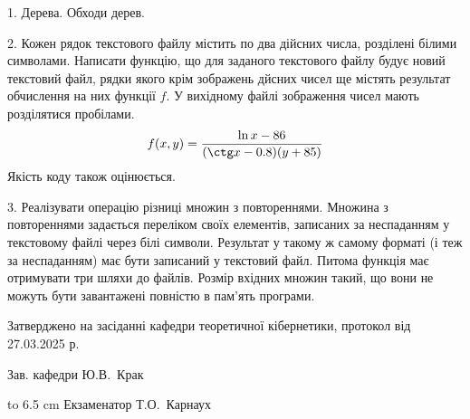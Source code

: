 \documentclass[12pt, ukrainian]{article}
\begin{document}
{%
1. Дерева. Обходи дерев.%
\par
\vspace{2mm}

2. Кожен рядок текстового файлу містить по два дійсних числа, розділені білими символами.
Написати функцію, що для заданого текстового файлу будує новий текстовий файл, рядки якого крім зображень дйсних чисел ще містять результат обчислення на них функції $f$. У вихідному файлі зображення чисел мають розділятися пробілами. 
$$f(x, y) =\frac{\ln x - 86}{(\ctg x - 0.8) (y + 85)}$$ 
Якість коду також оцінюється.

\par
\vspace{2mm}

3. Реалізувати операцію різниці множин з повтореннями. Множина з повтореннями задається переліком своїх елементів, записаних за неспаданням у текстовому файлі через білі символи. Результат у такому ж самому форматі (і теж за неспаданням) має бути записаний у текстовий файл. Питома функція має отримувати три шляхи до файлів. Розмір вхідних множин такий, що вони не можуть бути завантажені повністю в пам’ять програми.

}
{\smallskip\smallskip \begin {scriptsize} Затверджено на засіданні кафедри теоретичної кібернетики, протокол   від   27.03.2025 р.\par\smallskip\smallskip\smallskip\smallskip
{\parbox {6.5 cm} {Зав. кафедри \dotfill Ю.В.~Крак}}\hspace {0.7cm} {\hbox to 6.5 cm { Екзаменатор \dotfill Т.О.~Карнаух}} \end{scriptsize}}
\newpage
\end{document}
